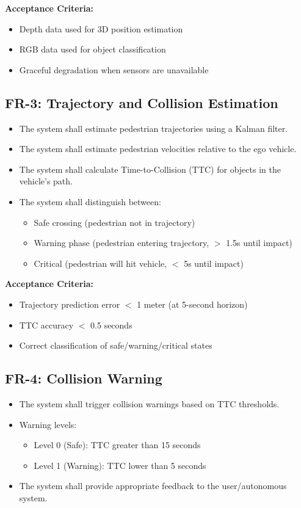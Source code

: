 \textbf{Acceptance Criteria:}
\begin{itemize}
    \item Depth data used for 3D position estimation
    \item RGB data used for object classification
    \item Graceful degradation when sensors are unavailable
\end{itemize}

\subsection{FR-3: Trajectory and Collision Estimation}

\begin{itemize}
    \item The system shall estimate pedestrian trajectories using a Kalman filter.
    \item The system shall estimate pedestrian velocities relative to the ego vehicle.
    \item The system shall calculate Time-to-Collision (TTC) for objects in the vehicle's path.
    \item The system shall distinguish between:
    \begin{itemize}
        \item Safe crossing (pedestrian not in trajectory)
        \item Warning phase (pedestrian entering trajectory, $ > $ 1.5s until impact)
        \item Critical (pedestrian will hit vehicle, $ < $ 5s until impact)
    \end{itemize}
\end{itemize}

\textbf{Acceptance Criteria:}
\begin{itemize}
    \item Trajectory prediction error $ < $ 1 meter (at 5-second horizon)
    \item TTC accuracy $ < $ 0.5 seconds
    \item Correct classification of safe/warning/critical states
\end{itemize}

\subsection{FR-4: Collision Warning}

\begin{itemize}
    \item The system shall trigger collision warnings based on TTC thresholds.
    \item Warning levels:
    \begin{itemize}
        \item Level 0 (Safe): TTC greater than 15 seconds
        \item Level 1 (Warning): TTC lower than 5 seconds
    \end{itemize}
    \item The system shall provide appropriate feedback to the user/autonomous system.
\end{itemize}

